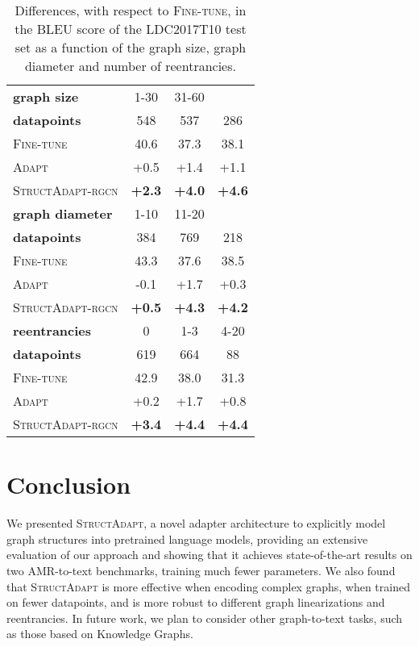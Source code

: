 \documentclass[11pt]{article}
\newcommand{\graphadapter}{{\small\textsc{StructAdapt}}\xspace}
\newcommand{\graphadapterrgcn}{{\small\textsc{StructAdapt-rgcn}}\xspace}
\newcommand{\vanilladapter}{{\small\textsc{Adapt}}\xspace}
\newcommand{\finetune}{{\small\textsc{Fine-tune}}\xspace}
\begin{document}
\begin{table}[t]
\small
\centering
{\renewcommand{\arraystretch}{0.9}

\begin{tabular}{lccc} 
\toprule
 \textbf{graph size}& 1-30 & 31-60 &   \\
 \textbf{ datapoints} & 548 & 537 & 286  \\
\midrule
\finetune & 40.6 & 37.3 & 38.1 \\
\vanilladapter  & +0.5 & +1.4 & +1.1 \\
\graphadapterrgcn  & \textbf{+2.3}  & \textbf{+4.0} & \textbf{+4.6} \\
\toprule
 \textbf{graph diameter}& 1-10 & 11-20 &   \\
 \textbf{ datapoints} & 384 & 769 & 218  \\
\midrule
\finetune & 43.3 & 37.6 & 38.5  \\
\vanilladapter  & -0.1 & +1.7 & +0.3 \\
\graphadapterrgcn  & \textbf{+0.5}  & \textbf{+4.3} & \textbf{+4.2} \\
\toprule
 \textbf{ reentrancies}& 0 & 1-3 & 4-20  \\
 \textbf{ datapoints} & 619 & 664 & 88  \\
\midrule
\finetune & 42.9 & 38.0 & 31.3 \\
\vanilladapter  & +0.2 & +1.7 & +0.8 \\
\graphadapterrgcn  & \textbf{+3.4}  & \textbf{+4.4} & \textbf{+4.4} \\
\bottomrule
\end{tabular}}
\caption{Differences, with respect to  \finetune, in the BLEU score of the LDC2017T10 test set as a function of the graph size, graph diameter and number of reentrancies.}
\label{tab:reentrances}

\end{table}


\section{Conclusion}

We presented \graphadapter, a novel adapter architecture to explicitly model graph structures into pretrained language models, providing an extensive evaluation of our approach and showing that it achieves state-of-the-art results on two AMR-to-text benchmarks, training much fewer parameters. We also found that \graphadapter is more effective when encoding complex graphs, when trained on fewer datapoints, and is more robust to different graph linearizations and reentrancies. In future work, we plan to consider other graph-to-text tasks, such as those based on Knowledge Graphs.
\end{document}
